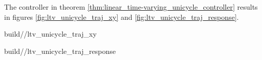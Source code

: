 The controller in theorem \ref{thm:linear_time-varying_unicycle_controller}
results in figures \ref{fig:ltv_unicycle_traj_xy} and
\ref{fig:ltv_unicycle_traj_response}.
\begin{bookfigure}
  \begin{minisvg}{2}{build/\chapterpath/ltv_unicycle_traj_xy}
    \caption{Linear time-varying unicycle controller x-y plot}
    \label{fig:ltv_unicycle_traj_xy}
  \end{minisvg}
  \hfill
  \begin{minisvg}{2}{build/\chapterpath/ltv_unicycle_traj_response}
    \caption{Linear time-varying unicycle controller response}
    \label{fig:ltv_unicycle_traj_response}
  \end{minisvg}
\end{bookfigure}
